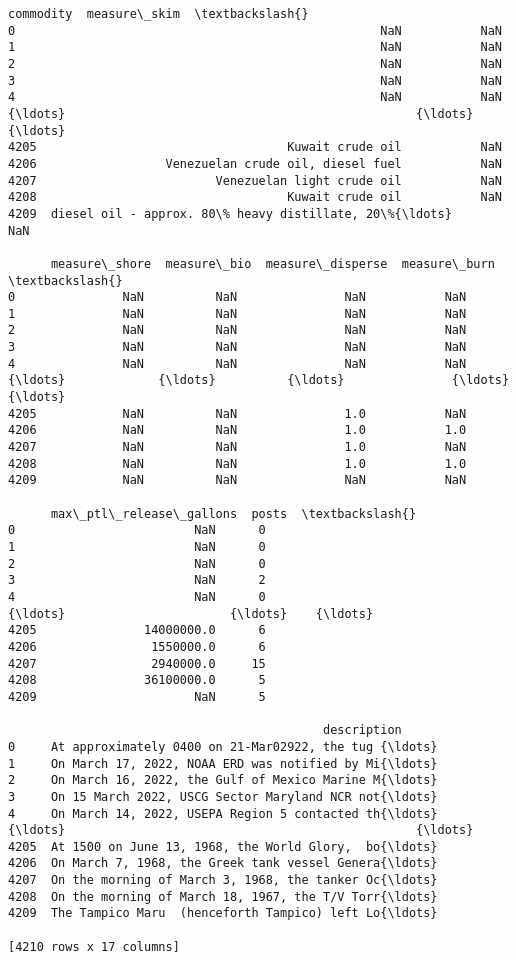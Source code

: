 \documentclass[11pt]{article}
\begin{document}
\begin{tcolorbox}[breakable, size=fbox, boxrule=.5pt, pad at break*=1mm, opacityfill=0]
\begin{Verbatim}[commandchars=\\\{\}]
                                              commodity  measure\_skim  \textbackslash{}
0                                                   NaN           NaN
1                                                   NaN           NaN
2                                                   NaN           NaN
3                                                   NaN           NaN
4                                                   NaN           NaN
{\ldots}                                                 {\ldots}           {\ldots}
4205                                   Kuwait crude oil           NaN
4206                  Venezuelan crude oil, diesel fuel           NaN
4207                         Venezuelan light crude oil           NaN
4208                                   Kuwait crude oil           NaN
4209  diesel oil - approx. 80\% heavy distillate, 20\%{\ldots}           NaN

      measure\_shore  measure\_bio  measure\_disperse  measure\_burn  \textbackslash{}
0               NaN          NaN               NaN           NaN
1               NaN          NaN               NaN           NaN
2               NaN          NaN               NaN           NaN
3               NaN          NaN               NaN           NaN
4               NaN          NaN               NaN           NaN
{\ldots}             {\ldots}          {\ldots}               {\ldots}           {\ldots}
4205            NaN          NaN               1.0           NaN
4206            NaN          NaN               1.0           1.0
4207            NaN          NaN               1.0           NaN
4208            NaN          NaN               1.0           1.0
4209            NaN          NaN               NaN           NaN

      max\_ptl\_release\_gallons  posts  \textbackslash{}
0                         NaN      0
1                         NaN      0
2                         NaN      0
3                         NaN      2
4                         NaN      0
{\ldots}                       {\ldots}    {\ldots}
4205               14000000.0      6
4206                1550000.0      6
4207                2940000.0     15
4208               36100000.0      5
4209                      NaN      5

                                            description
0     At approximately 0400 on 21-Mar02922, the tug {\ldots}
1     On March 17, 2022, NOAA ERD was notified by Mi{\ldots}
2     On March 16, 2022, the Gulf of Mexico Marine M{\ldots}
3     On 15 March 2022, USCG Sector Maryland NCR not{\ldots}
4     On March 14, 2022, USEPA Region 5 contacted th{\ldots}
{\ldots}                                                 {\ldots}
4205  At 1500 on June 13, 1968, the World Glory,  bo{\ldots}
4206  On March 7, 1968, the Greek tank vessel Genera{\ldots}
4207  On the morning of March 3, 1968, the tanker Oc{\ldots}
4208  On the morning of March 18, 1967, the T/V Torr{\ldots}
4209  The Tampico Maru  (henceforth Tampico) left Lo{\ldots}

[4210 rows x 17 columns]
\end{Verbatim}
\end{tcolorbox}
        
\end{document}
